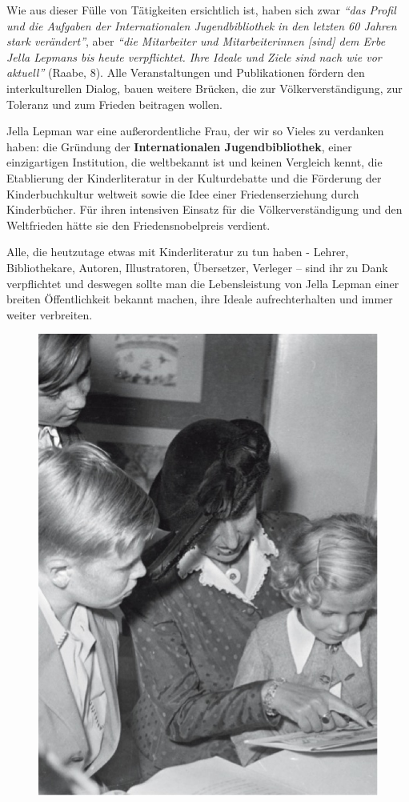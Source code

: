 \documentclass[a4paper,
fontsize=11pt,
oneside,
numbers=noperiodatend,
parskip=half-,
bibliography=totoc,
final
]{scrartcl}
\begin{document}
Wie aus dieser Fülle von Tätigkeiten ersichtlich ist, haben sich zwar
\emph{\enquote{das Profil und die Aufgaben der Internationalen
Jugendbibliothek in den letzten 60 Jahren stark verändert}}, aber
\emph{\enquote{die Mitarbeiter und Mitarbeiterinnen {[}sind{]} dem Erbe
Jella Lepmans bis heute verpflichtet. Ihre Ideale und Ziele sind nach
wie vor aktuell}} (Raabe, 8). Alle Veranstaltungen und Publikationen
fördern den interkulturellen Dialog, bauen weitere Brücken, die zur
Völkerverständigung, zur Toleranz und zum Frieden beitragen wollen.

Jella Lepman war eine außerordentliche Frau, der wir so Vieles zu
verdanken haben: die Gründung der \textbf{Internationalen
Jugendbibliothek}, einer einzigartigen Institution, die weltbekannt ist
und keinen Vergleich kennt, die Etablierung der Kinderliteratur in der
Kulturdebatte und die Förderung der Kinderbuchkultur weltweit sowie die
Idee einer Friedenserziehung durch Kinderbücher. Für ihren intensiven
Einsatz für die Völkerverständigung und den Weltfrieden hätte sie den
Friedensnobelpreis verdient.~

Alle, die heutzutage etwas mit Kinderliteratur zu tun haben - Lehrer,
Bibliothekare, Autoren, Illustratoren, Übersetzer, Verleger -- sind ihr
zu Dank verpflichtet und deswegen sollte man die Lebensleistung von
Jella Lepman einer breiten Öffentlichkeit bekannt machen, ihre Ideale
aufrechterhalten und immer weiter verbreiten.

\begin{figure}[htbp]
\centering
\includegraphics{img/bild30.jpg}
\end{figure}
\end{document}
